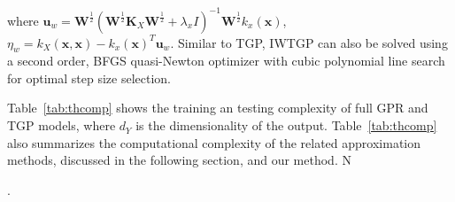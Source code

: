 where $\textbf{u}_w = \textbf{W}^\frac{1}{2}  (\textbf{W}^\frac{1}{2} \textbf{K}_X \textbf{W}^\frac{1}{2} + \lambda_x I)^{-1} \textbf{W}^\frac{1}{2} k_x(\textbf{x})$, $\eta_w = k_X(\textbf{x},\textbf{x}) - k_x(\textbf{x})^T \textbf{u}_w$. Similar to TGP, IWTGP can also be solved using a second order, BFGS quasi-Newton optimizer with cubic polynomial line search for optimal step size selection.





 Table~\ref{tab:thcomp} shows the training an testing complexity of full GPR and TGP models, where $d_Y$ is the dimensionality of the output. Table~\ref{tab:thcomp} also summarizes the computational complexity of the related approximation methods, discussed in the following section, and our method. N.  %
 
 
